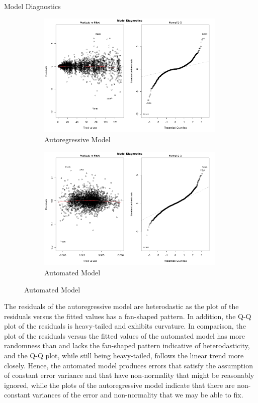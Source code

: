 \documentclass[]{article}
\begin{document}
\begin{section}{Model Diagnostics}
\begin{figure}[h]
\begin{subfigure}{.5\textwidth}
  \includegraphics[width=90mm]{diagnostics/arm_model_plots.png}
  \caption{Autoregressive Model}
\end{subfigure}%
\begin{subfigure}{.5\textwidth}
  \includegraphics[width=90mm]{diagnostics/fm_model_plots.png}
  \caption{Automated Model}
\end{subfigure}
\end{figure}

The residuals of the autoregressive model are heterodastic as the plot of the residuals versus the fitted values has a fan-shaped pattern. In addition, the Q-Q plot of the residuals is heavy-tailed and exhibits curvature. In comparison, the plot of the residuals versus the fitted values of the automated model has more randomness than and lacks the fan-shaped pattern indicative of heterodasticity, and the Q-Q plot, while still being heavy-tailed, follows the linear trend more closely. Hence, the automated model produces errors that satisfy the assumption of constant error variance and that have non-normality that might be reasonably ignored, while the plots of the autoregressive model indicate that there are non-constant variances of the error and non-normality that we may be able to fix.



\end{section}
\end{document}
